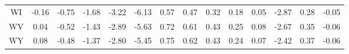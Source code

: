 \begin{table}
\begin{tabular}{cccccccccccccc}
   WI & -0.16 & -0.75 & -1.68 & -3.22 & -6.13 &  0.57 &  0.47 &  0.32 &  0.18 &  0.05 &   -2.87 &     0.28 &     -0.05 \\
   WV &  0.04 & -0.52 & -1.43 & -2.89 & -5.63 &  0.72 &  0.61 &  0.43 &  0.25 &  0.08 &   -2.67 &     0.35 &     -0.06 \\
   WY &  0.08 & -0.48 & -1.37 & -2.80 & -5.45 &  0.75 &  0.62 &  0.43 &  0.24 &  0.07 &   -2.42 &     0.37 &     -0.06 \\
\bottomrule
\end{tabular}
\end{table}
